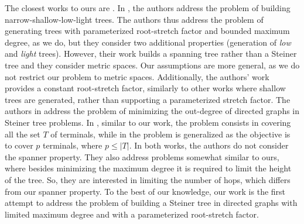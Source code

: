The closest works to ours are \cite{Elkin2009,Elkin2011,Elkin2006,Khandekar2011}. In \cite{Elkin2009,Elkin2011}, the authors address the problem of building narrow-shallow-low-light trees. 
The authors thus address the problem of generating trees with parameterized root-stretch factor 
and bounded maximum degree, as we do, but they consider two additional properties (generation of 
\emph{low} and \emph{light} trees).
However, their work builds a spanning tree rather than a Steiner tree and they consider metric spaces. Our assumptions are more
general, as we do not restrict our problem to metric spaces. Additionally, 
the authors' work provides a constant root-stretch factor, similarly to other works where shallow trees are generated, rather than supporting a parameterized stretch factor. 
The authors in \cite{Elkin2006,Khandekar2011} address the problem of minimizing the out-degree of directed graphs in Steiner tree problems. 
In \cite{Elkin2006}, similar to our work, the problem consists in covering all the set $T$ of terminals, 
while in \cite{Khandekar2011} the problem is generalized as the objective is to cover $p$ terminals, where $p \leq |T|$. In both works, the authors do not consider the spanner property. They also address problems 
somewhat similar to ours, where besides minimizing the maximum degree it is required to limit the height of the tree. So, they are interested in limiting the 
number of hops, which differs from our spanner property. To the best of our knowledge, our work is the first attempt to address the problem of building a Steiner 
tree in directed graphs with limited maximum degree and with a parameterized root-stretch factor.



